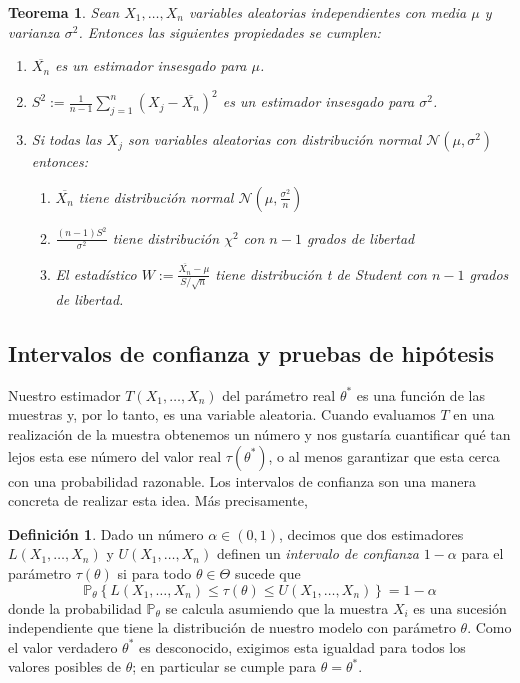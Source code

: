 \documentclass[12pt]{amsart}
\newtheorem{theorem}[lemma]{Teorema}
\theoremstyle{definition}
\newtheorem{definition}[lemma]{Definición}
\renewcommand{\leq}{\leqslant}
\newcommand{\PP}{\ensuremath{\mathbb{P}}}
\begin{document}
\begin{theorem} Sean $X_1,\dots, X_n$ variables aleatorias independientes con media $\mu$ y varianza $\sigma^2$. Entonces las siguientes propiedades se cumplen:
\begin{enumerate}
    \item $\overline{X_n}$ es un estimador insesgado para $\mu$.
    \item $S^2:=\frac{1}{n-1}\sum_{j=1}^n \left(X_j-\overline{X_n}\right)^{2}$ es un estimador insesgado para $\sigma^2$. 
    \item Si todas las $X_j$ son variables aleatorias con distribución normal $\mathcal{N}(\mu,\sigma^2)$ entonces:
    \begin{enumerate}
        \item $\overline{X_n}$ tiene distribución normal $\mathcal{N}(\mu,\frac{\sigma^2}{n})$
        \item $\frac{(n-1)S^2}{\sigma^2}$ tiene distribución $\chi^2$ con $n-1$ grados de libertad
        \item El estadístico $W:=\frac{\overline{X_n}-\mu}{S/\sqrt{n}}$ tiene distribución t de Student con $n-1$ grados de libertad.
    \end{enumerate} 
\end{enumerate}
\end{theorem}

\subsection{Intervalos de confianza y pruebas de hipótesis}

Nuestro estimador $T(X_1,\dots, X_n)$ del parámetro real $\theta^*$ es una función de las muestras y, por lo tanto, es una variable aleatoria. Cuando evaluamos $T$ en una realización de la muestra obtenemos un número y nos gustaría cuantificar qué tan lejos esta ese número del valor real $\tau(\theta^*)$, o al menos garantizar que esta cerca con una probabilidad razonable. Los intervalos de confianza son una manera concreta de realizar esta idea. Más precisamente,

\begin{definition} Dado un número $\alpha\in (0,1)$, decimos que dos estimadores $L(X_1,\dots, X_n)$ y $U(X_1,\dots, X_n)$ definen un \emph{intervalo de confianza} $1-\alpha$  para el parámetro $\tau(\theta)$ si para todo $\theta\in \Theta$ sucede que
    \[\PP_{\theta}\left\{ L(X_1,\dots, X_n)\leq \tau(\theta) \leq U(X_1,\dots, X_n)\right\}=1-\alpha\]
donde la probabilidad $\PP_{\theta}$ se calcula asumiendo que la muestra $X_i$ es una sucesión independiente que tiene la distribución de nuestro modelo con parámetro $\theta$. Como el valor verdadero $\theta^*$ es desconocido, exigimos esta igualdad para todos los valores posibles de $\theta$; en particular se cumple para $\theta=\theta^*$.    
\end{definition}
\end{document}

